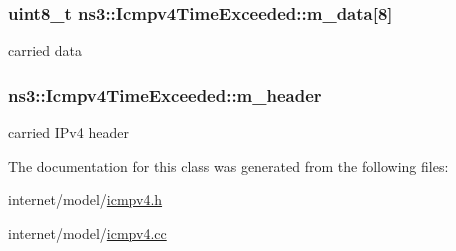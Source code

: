 \subsubsection[{\texorpdfstring{m\+\_\+data}{m_data}}]{\setlength{\rightskip}{0pt plus 5cm}uint8\+\_\+t ns3\+::\+Icmpv4\+Time\+Exceeded\+::m\+\_\+data\mbox{[}8\mbox{]}\hspace{0.3cm}{\ttfamily [private]}}\hypertarget{classns3_1_1Icmpv4TimeExceeded_aba5d782cc4d349b001a06d09e491fb8e}{}\label{classns3_1_1Icmpv4TimeExceeded_aba5d782cc4d349b001a06d09e491fb8e}


carried data 

\subsubsection[{\texorpdfstring{m\+\_\+header}{m_header}}]{ ns3\+::\+Icmpv4\+Time\+Exceeded\+::m\+\_\+header\hspace{0.3cm}{\ttfamily [private]}}\hypertarget{classns3_1_1Icmpv4TimeExceeded_a31b8b232ece2371735f0eeaff96227ea}{}\label{classns3_1_1Icmpv4TimeExceeded_a31b8b232ece2371735f0eeaff96227ea}


carried I\+Pv4 header 



The documentation for this class was generated from the following files\+:\begin{DoxyCompactItemize}
\item 
internet/model/\hyperlink{icmpv4_8h}{icmpv4.\+h}\item 
internet/model/\hyperlink{icmpv4_8cc}{icmpv4.\+cc}\end{DoxyCompactItemize}
